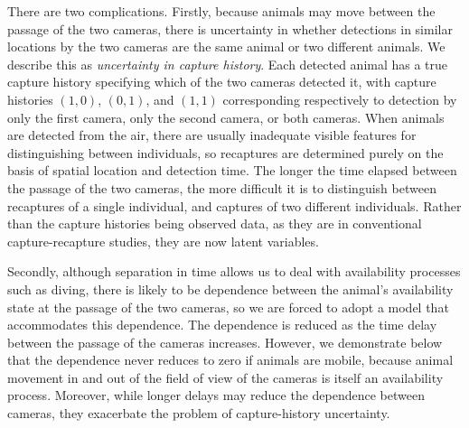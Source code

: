 \documentclass[useAMS, usenatbib, referee]{biom}\usepackage[]{graphicx}\usepackage[]{color}
\begin{document}
There are two complications. Firstly, because animals may move between the passage of the two cameras, there is uncertainty in whether detections in similar locations by the two cameras are the same animal or two different animals. We describe this as {\em uncertainty in capture history}. Each detected animal has a true capture history specifying which of the two cameras detected it, with capture histories $(1, 0)$, $(0, 1)$, and $(1, 1)$ corresponding respectively to detection by only the first camera, only the second camera, or both cameras. When animals are detected from the air, there are usually inadequate visible features for distinguishing between individuals, so recaptures are determined purely on the basis of spatial location and detection time. The longer the time elapsed between the passage of the two cameras, the more difficult it is to distinguish between recaptures of a single individual, and captures of two different individuals. Rather than the capture histories being observed data, as they are in conventional capture-recapture studies, they are now latent variables.

Secondly, although separation in time allows us to deal with availability processes such as diving, there is likely to be dependence between the animal's availability state at the passage of the two cameras, so we are forced to adopt a model that accommodates this dependence. The dependence is reduced as the time delay between the passage of the cameras increases. However, we demonstrate below that the dependence never reduces to zero if animals are mobile, because animal movement in and out of the field of view of the cameras is itself an availability process. Moreover, while longer delays may reduce the dependence between cameras, they exacerbate the problem of capture-history uncertainty.

\end{document}
